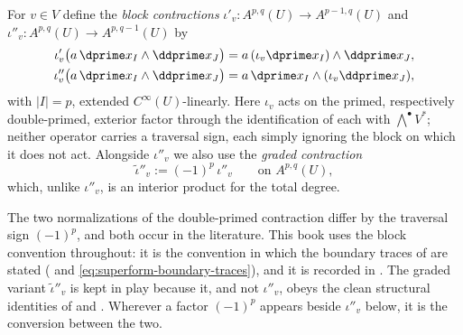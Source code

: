 \begin{definition}
\label{def:ch09-contraction}
For $v\in V$ define the \emph{block contractions}
$\iota'_v:A^{p,q}(U)\to A^{p-1,q}(U)$ and
$\iota''_v:A^{p,q}(U)\to A^{p,q-1}(U)$ by
\[
 \begin{aligned}
  \iota'_v\bigl(a\,\dprime x_I\wedge\ddprime x_J\bigr)
   &=a\,(\iota_v\dprime x_I)\wedge\ddprime x_J,\\
  \iota''_v\bigl(a\,\dprime x_I\wedge\ddprime x_J\bigr)
   &=a\,\dprime x_I\wedge(\iota_v\ddprime x_J),
 \end{aligned}
\]
with $|I|=p$, extended $C^\infty(U)$-linearly.  Here $\iota_v$ acts on the
primed, respectively double-primed, exterior factor through the
identification of each with $\bigwedge^\bullet V^*$; neither operator carries
a traversal sign, each simply ignoring the block on which it does not act.
Alongside $\iota''_v$ we also use the \emph{graded contraction}
\[
 \widetilde\iota''_v:=(-1)^p\,\iota''_v
 \qquad\text{on }A^{p,q}(U),
\]
which, unlike $\iota''_v$, is an interior product for the total degree.
\end{definition}

\begin{remark}
\label{rem:ch09-contraction-convention}
The two normalizations of the double-primed contraction differ by the
traversal sign $(-1)^p$, and both occur in the literature.  This book uses
the block convention throughout: it is the convention in which the boundary
traces of  are stated
( and \eqref{eq:superform-boundary-traces}), and
it is recorded in .  The graded variant
$\widetilde\iota''_v$ is kept in play because it, and not $\iota''_v$, obeys
the clean structural identities of  and
.  Wherever a factor $(-1)^p$ appears beside
$\iota''_v$ below, it is the conversion between the two.
\end{remark}

